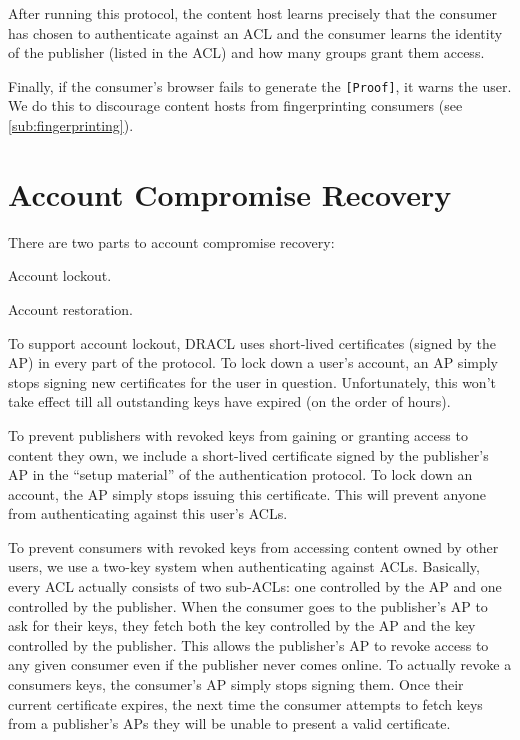 \documentclass[pdftex,12pt,a4papaer]{report}
\begin{document}
After running this protocol, the content host learns precisely that the consumer
has chosen to authenticate against an ACL and the consumer learns the identity
of the publisher (listed in the ACL) and how many groups grant them access.

Finally, if the consumer's browser fails to generate the \verb=[Proof]=, it
warns the user. We do this to discourage content hosts from fingerprinting
consumers (see \ref{sub:fingerprinting}).

\section{Account Compromise Recovery}

There are two parts to account compromise recovery:

\begin{compactenum}
\item Account lockout.
\item Account restoration.
\end{compactenum}

To support account lockout, DRACL uses short-lived certificates (signed by the
AP) in every part of the protocol. To lock down a user's account, an AP simply
stops signing new certificates for the user in question. Unfortunately, this
won't take effect till all outstanding keys have expired (on the order of
hours).

To prevent publishers with revoked keys from gaining or granting access to
content they own, we include a short-lived certificate signed by the publisher's
AP in the ``setup material'' of the authentication protocol. To lock down an
account, the AP simply stops issuing this certificate. This will prevent anyone
from authenticating against this user's ACLs.

To prevent consumers with revoked keys from accessing content owned by other
users, we use a two-key system when authenticating against ACLs. Basically,
every ACL actually consists of two sub-ACLs: one controlled by the AP and one
controlled by the publisher. When the consumer goes to the publisher's
AP to ask for their keys, they fetch both the key controlled by the AP and the
key controlled by the publisher. This allows the publisher's AP to
revoke access to any given consumer even if the publisher never comes
online. To actually revoke a consumers keys, the consumer's AP simply stops
signing them. Once their current certificate expires, the next time the consumer
attempts to fetch keys from a publisher's APs they will be unable to present
a valid certificate.
\end{document}
